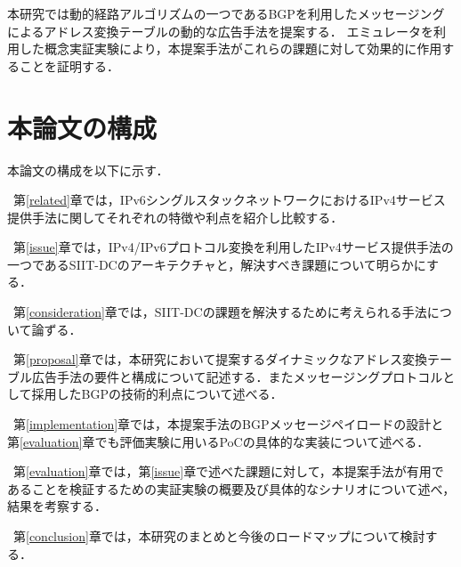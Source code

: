 本研究では動的経路アルゴリズムの一つであるBGP\cite{RFC4271}を利用したメッセージングによるアドレス変換テーブルの動的な広告手法を提案する．
エミュレータを利用した概念実証実験により，本提案手法がこれらの課題に対して効果的に作用することを証明する．



\section{本論文の構成}

本論文の構成を以下に示す．

~第\ref{related}章では，IPv6シングルスタックネットワークにおけるIPv4サービス提供手法に関してそれぞれの特徴や利点を紹介し比較する．

~第\ref{issue}章では，IPv4/IPv6プロトコル変換を利用したIPv4サービス提供手法の一つであるSIIT-DCのアーキテクチャと，解決すべき課題について明らかにする．

~第\ref{consideration}章では，SIIT-DCの課題を解決するために考えられる手法について論ずる．

~第\ref{proposal}章では，本研究において提案するダイナミックなアドレス変換テーブル広告手法の要件と構成について記述する．またメッセージングプロトコルとして採用したBGPの技術的利点について述べる．

~第\ref{implementation}章では，本提案手法のBGPメッセージペイロードの設計と第\ref{evaluation}章でも評価実験に用いるPoCの具体的な実装について述べる．

~第\ref{evaluation}章では，第\ref{issue}章で述べた課題に対して，本提案手法が有用であることを検証するための実証実験の概要及び具体的なシナリオについて述べ，結果を考察する．

~第\ref{conclusion}章では，本研究のまとめと今後のロードマップについて検討する．

